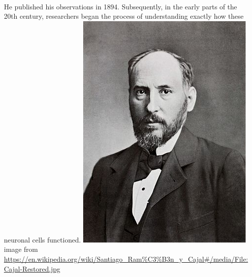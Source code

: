 \documentclass[12pt,a4paper]{article}
\begin{document}
\paragraph{}
He published his observations in 1894. Subsequently, in the early parts of the 20th century, researchers began the process of understanding exactly how these neuronal cells functioned. 
\newline
\includegraphics[scale=1]{Cajal-Restored.jpg}\newline
image from\newline
\url{https://en.wikipedia.org/wiki/Santiago_Ram%C3%B3n_y_Cajal#/media/File:Cajal-Restored.jpg}
\newline
\end{document}

